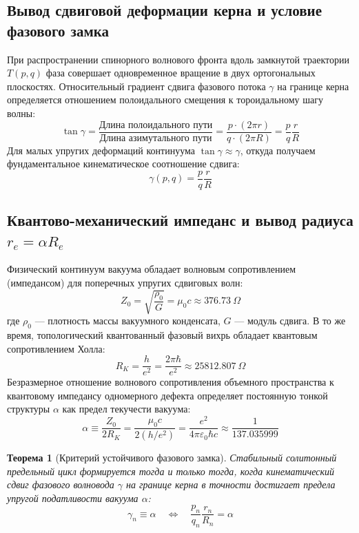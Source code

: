 \documentclass[12pt,a4paper]{article}
\newtheorem{theorem}{Теорема}
\begin{document}
	\subsection{Вывод сдвиговой деформации керна и условие фазового замка}
	При распространении спинорного волнового фронта вдоль замкнутой траектории $T(p,q)$ фаза совершает одновременное вращение в двух ортогональных плоскостях. 
	Относительный градиент сдвига фазового потока $\gamma$ на границе керна определяется отношением полоидального смещения к тороидальному шагу волны:
	\begin{equation}
		\tan\gamma = \frac{\text{Длина полоидального пути}}{\text{Длина азимутального пути}} = \frac{p \cdot (2\pi r)}{q \cdot (2\pi R)} = \frac{p}{q} \frac{r}{R}
	\end{equation}
	Для малых упругих деформаций континуума $\tan\gamma \approx \gamma$, откуда получаем фундаментальное кинематическое соотношение сдвига:
	\begin{equation}
		\gamma(p,q) = \frac{p}{q} \frac{r}{R}
	\end{equation}
			
	\subsection{Квантово-механический импеданс и вывод радиуса $r_e = \alpha R_e$}
	Физический континуум вакуума обладает волновым сопротивлением (импедансом) для поперечных упругих сдвиговых волн:
	\begin{equation}
		Z_0 = \sqrt{\frac{\rho_0}{G}} = \mu_0 c \approx 376.73 \ \Omega
	\end{equation}
	где $\rho_0$ — плотность массы вакуумного конденсата, $G$ — модуль сдвига.
	В то же время, топологический квантованный фазовый вихрь обладает квантовым сопротивлением Холла:
	\begin{equation}
		R_K = \frac{h}{e^2} = \frac{2\pi \hbar}{e^2} \approx 25812.807 \ \Omega
	\end{equation}
	Безразмерное отношение волнового сопротивления объемного пространства к квантовому импедансу одномерного дефекта определяет постоянную тонкой структуры $\alpha$ как предел текучести вакуума:
	\begin{equation}
		\alpha \equiv \frac{Z_0}{2 R_K} = \frac{\mu_0 c}{2 (h/e^2)} = \frac{e^2}{4\pi \varepsilon_0 \hbar c} \approx \frac{1}{137.035999}
	\end{equation}
	
	\begin{theorem}[Критерий устойчивого фазового замка]
		Стабильный солитонный предельный цикл формируется тогда и только тогда, когда кинематический сдвиг фазового волновода $\gamma$ на границе керна в точности достигает предела упругой податливости вакуума $\alpha$:
		\begin{equation}
			\gamma_n \equiv \alpha \quad \Longleftrightarrow \quad \frac{p_n}{q_n} \frac{r_n}{R_n} = \alpha
		\end{equation}
	\end{theorem}
	
\end{document}
